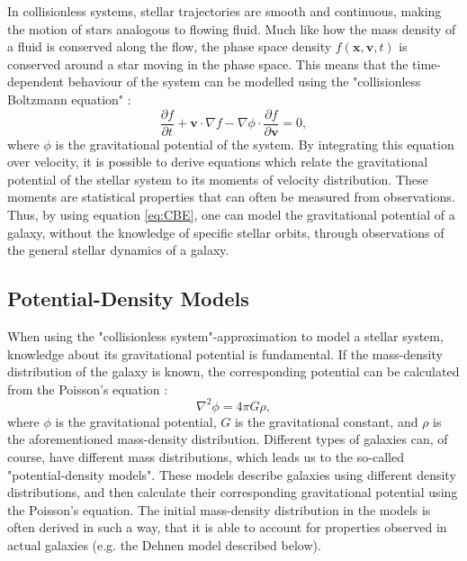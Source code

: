 \documentclass[english, twoside]{HYgradu}
\begin{document}
In collisionless systems, stellar trajectories are smooth and continuous, making the motion of stars analogous to flowing fluid. Much like how the mass density of a fluid is conserved along the flow, the phase space density $f(\mathbf{x}, \mathbf{v}, t)$ is conserved around a star moving in the phase space. This means that the time-dependent behaviour of the system can be modelled using the "collisionless Boltzmann equation" \citep{MerrittBook}:
\begin{equation}
\frac{\partial f}{\partial t} + \mathbf{v} \cdot \nabla f - \nabla \phi \cdot \frac{\partial f}{\partial \mathbf{v}} = 0, \label{eq:CBE}
\end{equation}
where $\phi$ is the gravitational potential of the system. By integrating this equation over velocity, it is possible to derive equations which relate the gravitational potential of the stellar system to its moments of velocity distribution. These moments are statistical properties that can often be measured from observations. Thus, by using equation \ref{eq:CBE}, one can model the gravitational potential of a galaxy, without the knowledge of specific stellar orbits, through observations of the general stellar dynamics of a galaxy.
  
\subsection{Potential-Density Models} \label{section:potential_density}

When using the "collisionless system"-approximation to model a stellar system, knowledge about its gravitational potential is fundamental. If the mass-density distribution of the galaxy is known, the corresponding potential can be calculated from the Poisson's equation \citep{BinneyTremaine}:
\begin{equation}
\nabla^2 \phi = 4 \pi G \rho, \label{eq:poisson}
\end{equation}
where $\phi$ is the gravitational potential, $G$ is the gravitational constant, and $\rho$ is the aforementioned mass-density distribution. Different types of galaxies can, of course, have different mass distributions, which leads us to the so-called "potential-density models". These models describe galaxies using different density distributions, and then calculate their corresponding gravitational potential using the Poisson's equation. The initial mass-density distribution in the models is often derived in such a way, that it is able to account for properties observed in actual galaxies (e.g. the Dehnen model described below). 
\end{document}

